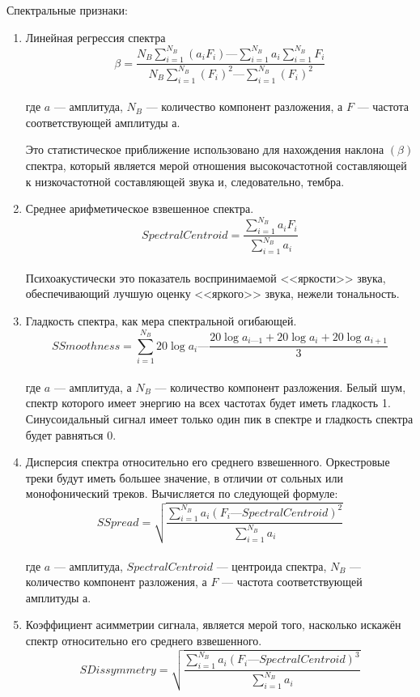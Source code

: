 Спектральные признаки:

\begin{enumerate}[label=\arabic*.]
\item Линейная регрессия спектра
\begin{equation}\label{eq:regression}
\beta = \frac{ N_B \sum\limits_{i=1}^{N_B} (a_i F_i) —  \sum\limits_{i=1}^{N_B} a_i  \sum\limits_{i=1}^{N_B} F_i}{N_B\sum\limits_{i=1}^{N_B} (F_i)^2 — \sum\limits_{i=1}^{N_B} (F_i)^2 }
\end{equation} \\
где $a$ — амплитуда,  $N_B$ — количество компонент разложения, а $F$ — частота соответствующей амплитуды $а$.

Это статистическое приближение использовано для нахождения наклона $(\beta)$ спектра, который является мерой отношения высокочастотной составляющей к низкочастотной составляющей звука и, следовательно, тембра. 
\item Среднее арифметическое взвешенное спектра.
\begin{equation}\label{eq:centroid}
SpectralCentroid = \frac{\sum \limits_{i=1}^{N_B} a_i F_i}{\sum \limits_{i=1}^{N_B} a_i}  
\end{equation}  \\
Психоакустически это показатель воспринимаемой <<яркости>> звука, обеспечивающий лучшую оценку <<яркого>> звука, нежели тональность.
\item Гладкость спектра, как мера спектральной огибающей.
\begin{equation}\label{eq:smooth}
SSmoothness = \sum \limits_{i=1}^{N_B} 20 \log a_i — \frac{20 \log a_{i—1} + 20 \log a_i + 20 \log a_{i+1}}{3}
\end{equation}  \\
где $ a $ — амплитуда,  а $N_B$ — количество компонент разложения.
Белый шум, спектр которого имеет энергию на всех частотах будет иметь гладкость 1. Синусоидальный сигнал имеет только один пик в спектре и гладкость спектра будет равняться 0. 
\item Дисперсия спектра относительно его среднего взвешенного.  Оркестровые треки будут иметь большее значение, в отличии от сольных или  монофонический треков. Вычисляется по следующей формуле:  
\begin{equation}\label{eq:spread}
SSpread = \sqrt{\frac{ \sum \limits_{i=1}^{N_B} a_i ( F_i — SpectralCentroid)^2 }{\sum \limits_{i=1}^{N_B} a_i}}
\end{equation}  \\
где $a$ — амплитуда, $SpectralCentroid$ — центроида спектра,  $N_B$ — количество компонент разложения, а $F$ — частота соответствующей амплитуды $ а $.
\item Коэффициент асимметрии сигнала, является мерой того, насколько искажён спектр относительно  его среднего взвешенного.
\begin{equation}\label{eq:Dissymmetry}
SDissymmetry = \sqrt{\frac{ \sum \limits_{i=1}^{N_B} a_i ( F_i — SpectralCentroid)^3 }{\sum \limits_{i=1}^{N_B} a_i}}
\end{equation}  
\end{enumerate}


